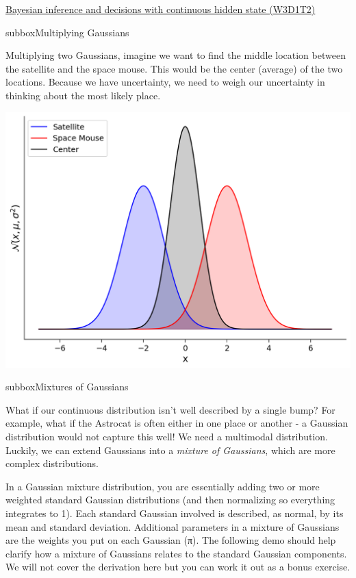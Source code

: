 \begin{textbox}{\href{https://compneuro.neuromatch.io/tutorials/W3D1_BayesianDecisions/student/W3D1_Tutorial2.html}{Bayesian inference and decisions with continuous hidden state (W3D1T2)} }
\begin{subbox}{subbox}{Multiplying Gaussians}
\scriptsize

Multiplying two Gaussians, imagine we want to find the middle location between the satellite and the space mouse. This would be the center (average) of the two locations. Because we have uncertainty, we need to weigh our uncertainty in thinking about the most likely place. 


\begin{center}
    
\includegraphics[scale=0.18]{Figures/BD/BD_Figure6.png}
\end{center}
\end{subbox}
\begin{subbox}{subbox}{Mixtures of Gaussians}
\scriptsize

What if our continuous distribution isn't well described by a single bump? For example, what if the Astrocat is often either in one place or another - a Gaussian distribution would not capture this well! We need a multimodal distribution. Luckily, we can extend Gaussians into a \textit{mixture of Gaussians}, which are more complex distributions.  

In a Gaussian mixture distribution, you are essentially adding two or more weighted standard Gaussian distributions (and then normalizing so everything integrates to 1). Each standard Gaussian involved is described, as normal, by its mean and standard deviation. Additional parameters in a mixture of Gaussians are the weights you put on each Gaussian (π). The following demo should help clarify how a mixture of Gaussians relates to the standard Gaussian components. We will not cover the derivation here but you can work it out as a bonus exercise.


\end{subbox}
\end{textbox}
